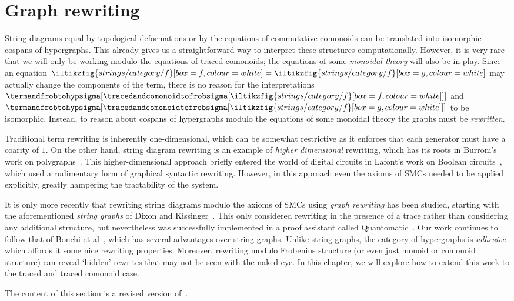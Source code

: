 \chapter{Graph rewriting}\label{chap:rewriting}

String diagrams equal by topological deformations or by the equations of
commutative comonoids can be translated into isomorphic cospans of hypergraphs.
This already gives us a straightforward way to interpret these structures
computationally.
However, it is very rare that we will only be working modulo the equations of
traced comonoids; the equations of some \emph{monoidal theory} will also be in
play.
Since an equation \(
\iltikzfig{strings/category/f}[box=f,colour=white]
=
\iltikzfig{strings/category/f}[box=g,colour=white]
\) may actually change the components of the term, there is no reason for the
interpretations \(
\termandfrobtohypsigma[
    \tracedandcomonoidtofrobsigma[
        \iltikzfig{strings/category/f}[box=f,colour=white]
    ]
]
\) and \(
\termandfrobtohypsigma[
    \tracedandcomonoidtofrobsigma[
        \iltikzfig{strings/category/f}[box=g,colour=white]
    ]
]
\) to be isomorphic.
Instead, to reason about cospans of hypergraphs modulo the equations of some
monoidal theory the graphs must be \emph{rewritten}.

Traditional term rewriting is inherently one-dimensional, which can be somewhat
restrictive as it enforces that each generator must have a coarity of \(1\).
On the other hand, string diagram rewriting is an example of
\emph{higher dimensional} rewriting, which has its roots in Burroni's work on
polygraphs~\cite{burroni1993higherdimensional}.
This higher-dimensional approach briefly entered the world of digital
circuits in Lafont's work on Boolean circuits~\cite{lafont2003algebraic}, which
used a rudimentary form of graphical syntactic rewriting.
However, in this approach even the axioms of SMCs needed to be applied
explicitly, greatly hampering the tractability of the system.

It is only more recently that rewriting string diagrams modulo the axioms of
SMCs using \emph{graph rewriting} has been studied, starting with the
aforementioned \emph{string graphs} of Dixon and
Kissinger~\cite{dixon2010open,kissinger2012pictures,dixon2013opengraphs}.
This only considered rewriting in the presence of a trace rather than
considering any additional structure, but nevertheless was successfully
implemented in a proof assistant called
Quantomatic~\cite{kissinger2015quantomatic}.
Our work continues to follow that of Bonchi et
al~\cite{bonchi2022string,bonchi2022stringa}, which has several advantages
over string graphs.
Unlike string graphs, the category of hypergraphs is
\emph{adhesive}~\cite{lack2004adhesive} which affords it some nice rewriting
properties.
Moreover, rewriting modulo Frobenius structure (or even just monoid or comonoid
structure) can reveal `hidden' rewrites that may not be seen with the naked eye.
In this chapter, we will explore how to extend this work to the traced and
traced comonoid case.

\begin{remark}
    The content of this section is a revised version
    of~\cite[Sec.\ 5]{ghica2023rewriting}.
\end{remark}





